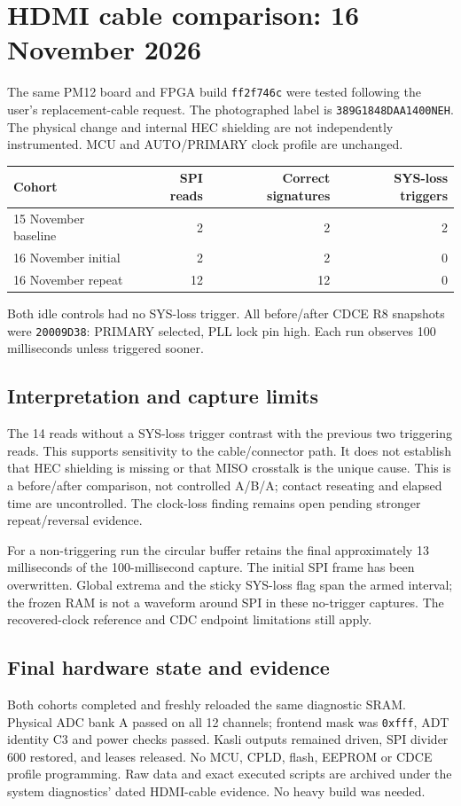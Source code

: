 \clearpage
\section{HDMI cable comparison: 16 November 2026}
The same PM12 board and FPGA build \texttt{ff2f746c} were tested following the
user's replacement-cable request. The photographed label is
\texttt{389G1848DAA1400NEH}. The physical change and internal HEC shielding are
not independently instrumented. MCU and AUTO/PRIMARY clock profile are unchanged.

\begin{center}\begin{tabular}{lrrr}\toprule
Cohort & SPI reads & Correct signatures & SYS-loss triggers\\\midrule
15 November baseline & 2 & 2 & 2\\
16 November initial & 2 & 2 & 0\\
16 November repeat & 12 & 12 & 0\\\bottomrule
\end{tabular}\end{center}
Both idle controls had no SYS-loss trigger. All before/after CDCE R8 snapshots
were \texttt{20009D38}: PRIMARY selected, PLL lock pin high.
Each run observes 100 milliseconds unless triggered sooner.

\subsection{Interpretation and capture limits}
The 14 reads without a SYS-loss trigger contrast with the previous two triggering
reads. This supports sensitivity to the cable/connector path. It does not establish
that HEC shielding is missing or that MISO crosstalk is the unique cause.
This is a before/after comparison, not controlled A/B/A; contact reseating and
elapsed time are uncontrolled. The clock-loss finding remains open pending
stronger repeat/reversal evidence.

For a non-triggering run the circular buffer retains the final approximately
13 milliseconds of the 100-millisecond capture. The initial SPI frame has been
overwritten. Global extrema and the sticky SYS-loss flag span the armed interval;
the frozen RAM is not a waveform around SPI in these no-trigger captures.
The recovered-clock reference and CDC endpoint limitations still apply.

\subsection{Final hardware state and evidence}
Both cohorts completed and freshly reloaded the same diagnostic SRAM. Physical
ADC bank A passed on all 12 channels; frontend mask was \texttt{0xfff}, ADT identity
C3 and power checks passed. Kasli outputs remained driven, SPI divider 600 restored,
and leases released. No MCU, CPLD, flash, EEPROM or CDCE profile programming.
Raw data and exact executed scripts are archived under the system diagnostics'
dated HDMI-cable evidence. No heavy build was needed.
